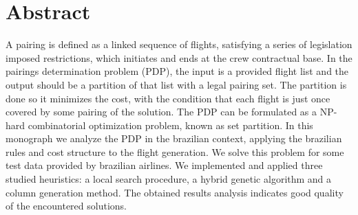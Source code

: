 \chapter*{Abstract}
\thispagestyle{empty}

A pairing is defined as a linked sequence of flights, satisfying a series of legislation imposed
restrictions, which initiates and ends at the crew contractual base. In the pairings determination
problem (PDP), the input is a provided flight list and the output should be a partition of that list
with a legal pairing set. The partition is done so it minimizes the cost, with the condition that
each flight is just once covered by some pairing of the solution. The PDP can be formulated as a
NP-hard combinatorial optimization problem, known as set partition. In this monograph we analyze the
PDP in the brazilian context, applying the brazilian rules and cost structure to the flight
generation. We solve this problem for some test data provided by brazilian airlines. We implemented
and applied three studied heuristics: a local search procedure, a hybrid genetic algorithm and a
column generation method. The obtained results analysis indicates good quality of the encountered
solutions.


